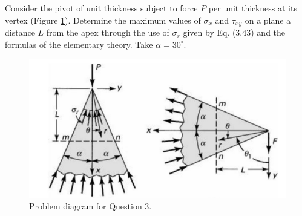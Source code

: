 \section{}
Consider the pivot of unit thickness subject to force $P$ per unit thickness at its vertex (Figure \ref{fig:Q3ProblemDiagram}).
Determine the maximum values of $\sigma_x$ and $\tau_{xy}$ on a plane a distance $L$ from the apex through the use of $\sigma_r$
given by Eq. (3.43) and the formulas of the elementary theory. Take $\alpha = 30^\circ$.
\begin{figure}[h]
    \centering
    \includegraphics[width=0.3\linewidth]{Questions/Figures/Q3ProblemDiagram.png}
    \caption{Problem diagram for Question 3.}
    \label{fig:Q3ProblemDiagram}
\end{figure}

